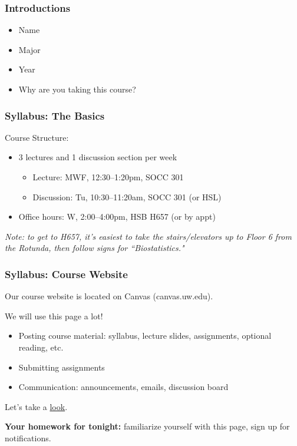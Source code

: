\documentclass[12pt, 
hyperref={colorlinks=true, linkcolor=blue, urlcolor=cyan}]{beamer}
\begin{document}
\begin{frame}
\frametitle{Introductions}
\begin{itemize}
\item Name
\item Major
\item Year
\item Why are you taking this course?
\end{itemize}
\end{frame}

\begin{frame}
\frametitle{Syllabus: The Basics}

Course Structure:
\begin{itemize}
\item 3 lectures and 1 discussion section per week
	\begin{itemize}
	\item Lecture: MWF, 12:30--1:20pm, SOCC 301
	\item Discussion: Tu, 10:30--11:20am, SOCC 301 (or HSL)
	\end{itemize}
\item Office hours: W, 2:00--4:00pm, HSB H657 (or by appt)
\end{itemize}

\small{\textit{Note: to get to H657, it's easiest to take the stairs/elevators up to Floor 6 from the Rotunda, then follow signs for ``Biostatistics."}}

\end{frame}

\begin{frame}
\frametitle{Syllabus: Course Website}

Our course website is located on Canvas (canvas.uw.edu). 

\color{blue} We will use this page a lot! \color{black} %
\begin{itemize}
\item Posting course material: syllabus, lecture slides, assignments, optional reading, etc. %
\item Submitting assignments
\item Communication: announcements, emails, discussion board
\end{itemize}

Let's take a \href{https://canvas.uw.edu/courses/1203588}{look}. %

\textbf{Your homework for tonight:} familiarize yourself with this page, sign up for notifications.

\end{frame}
\end{document}
